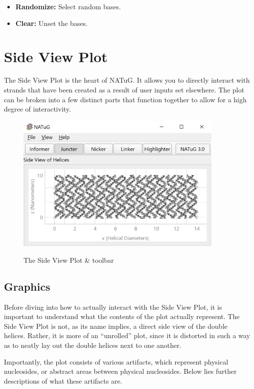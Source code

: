 \documentclass[
titlepage,
fontsize=12pt
]{article}
\begin{document}
	\begin{itemize}
		\item \textbf{Randomize:} Select random bases.
		\item \textbf{Clear:} Unset the bases.
	\end{itemize}
	
	\section{Side View Plot}
	The Side View Plot is the heart of NATuG. It allows you to directly interact with strands that have been created as a result of user inputs set elsewhere. The plot can be broken into a few distinct parts that function together to allow for a high degree of interactivity. 
	
	\begin{figure}[h]
		\centering
		\caption{The Side View Plot \& toolbar}
		\includegraphics[width=4in]{short-side-view-overview.png}
		\label{fig:short-side-view-overview}
	\end{figure}

	\subsection{Graphics}
	Before diving into how to actually interact with the Side View Plot, it is important to understand what the contents of the plot actually represent. The Side View Plot is not, as its name implies, a direct side view of the double helices. Rather, it is more of an “unrolled” plot, since it is distorted in such a way as to neatly lay out the double helices next to one another.
	
	Importantly, the plot consists of various artifacts, which represent physical nucleosides, or abstract areas between physical nucleosides. Below lies further descriptions of what these artifacts are.
	
\end{document}
